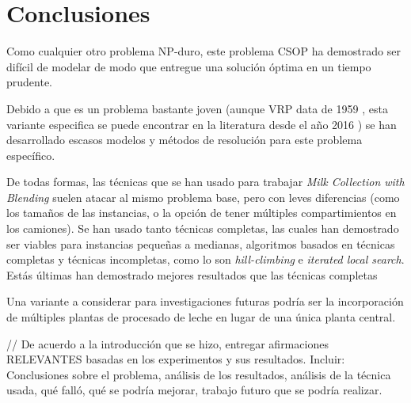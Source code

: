\section{Conclusiones}

Como cualquier otro problema NP-duro, este problema CSOP ha demostrado ser difícil de modelar de modo que entregue una solución óptima en un tiempo prudente.

Debido a que es un problema bastante joven (aunque VRP data de 1959 \cite{TruckDispatchingProblem}, esta variante especifica se puede encontrar en la literatura desde el año 2016 \cite{MilkWithBlending}) se han desarrollado escasos modelos y métodos de resolución para este problema específico.

De todas formas, las técnicas que se han usado para trabajar \textit{Milk Collection with Blending} suelen atacar al mismo problema base, pero con leves diferencias (como los tamaños de las instancias, o la opción de tener múltiples compartimientos en los camiones). Se han usado tanto técnicas completas, las cuales han demostrado ser viables para instancias pequeñas a medianas, algoritmos basados en técnicas completas y técnicas incompletas, como lo son \textit{hill-climbing} e \textit{iterated local search}. Estás últimas han demostrado mejores resultados que las técnicas completas

Una variante a considerar para investigaciones futuras podría ser la incorporación de múltiples plantas de procesado de leche en lugar de una única planta central.



// De acuerdo a la introducción que se hizo, entregar afirmaciones RELEVANTES basadas en los experimentos y sus resultados. Incluir: Conclusiones sobre el problema, análisis de los resultados, análisis de la técnica usada, qué falló, qué se podría mejorar, trabajo futuro que se podría realizar.


